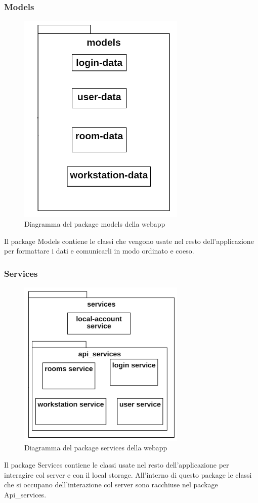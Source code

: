 \subsubsection{Models}
\begin{figure}[H]
	\centering
	\includegraphics[width=8cm]{res/images/webapp-models-diagrammaPackage.png}
	\caption{Diagramma del package models della webapp}
	\label{fig:DiagrammaPackageModelsWebapp}
\end{figure}
Il package Models contiene le classi che vengono usate nel resto dell'applicazione per formattare i dati e comunicarli in modo ordinato e coeso.

\subsubsection{Services}
\begin{figure}[H]
	\centering
	\includegraphics[width=8cm]{res/images/webapp-services-diagrammaPackage.png}
	\caption{Diagramma del package services della webapp}
	\label{fig:DiagrammaPackageServicesWebapp}
\end{figure}
Il package Services contiene le classi usate nel resto dell'applicazione per interagire col server e con il local storage. All'interno di questo package le classi che si occupano dell'interazione col server sono racchiuse nel package Api\_services.

